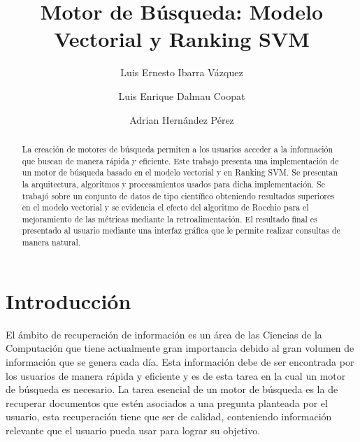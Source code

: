 \documentclass[runningheads]{llncs}
\begin{document}
%
\title{Motor de Búsqueda: Modelo Vectorial y Ranking SVM}
%
%
\author{Luis Ernesto Ibarra Vázquez \and
Luis Enrique Dalmau Coopat \and
Adrian Hernández Pérez}
%
%
%
\maketitle              %
%
\begin{abstract}
La creación de motores de búsqueda permiten a los usuarios acceder a la información
que buscan de manera rápida y eficiente. Este trabajo presenta una implementación de 
un motor de búsqueda basado en el modelo vectorial y en Ranking SVM. Se presentan la arquitectura,
algoritmos y procesamientos usados para dicha implementación. Se trabajó sobre un conjunto de datos
de tipo científico obteniendo resultados superiores en el modelo vectorial y se evidencia el efecto
del algoritmo de Rocchio para el mejoramiento de las métricas mediante la retroalimentación.
El resultado final es presentado al usuario mediante una interfaz gráfica que le permite
realizar consultas de manera natural.

\end{abstract}

\section{Introducción}

El ámbito de recuperación de información es un área de las Ciencias de la Computación que tiene
actualmente gran importancia debido al gran volumen de información que se genera cada día. 
Esta información debe de ser encontrada por los usuarios de manera rápida y eficiente y es
de esta tarea en la cual un motor de búsqueda es necesario. La tarea esencial de un motor de
búsqueda es la de recuperar documentos que estén asociados a una pregunta planteada por el usuario, 
esta recuperación tiene que ser de calidad, conteniendo información relevante que el usuario pueda
usar para lograr su objetivo.
\end{document}
